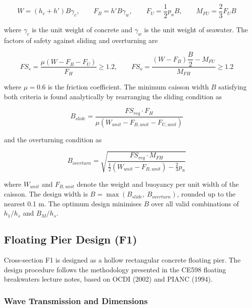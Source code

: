 \documentclass[a4paper, 11pt]{article}
\begin{document}
\begin{equation}
    W = (h_c + h')B\gamma_c, \qquad F_B = h'B\gamma_w, \qquad F_U = \frac{1}{2}p_u B, \qquad M_{FU} = \frac{2}{3}F_U B
\end{equation}

where $\gamma_c$ is the unit weight of concrete and $\gamma_w$ is the unit weight of seawater. The factors of safety against sliding and overturning are

\begin{equation}
    FS_s = \frac{\mu(W - F_B - F_U)}{F_H} \geq 1.2, \qquad FS_o = \frac{(W - F_B)\dfrac{B}{2} - M_{FU}}{M_{FH}} \geq 1.2
\end{equation}

where $\mu = 0.6$ is the friction coefficient. The minimum caisson width $B$ satisfying both criteria is found analytically by rearranging the sliding condition as

\begin{equation}
    B_{slide} = \frac{FS_{req} \cdot F_H}{\mu(W_{unit} - F_{B,unit} - F_{U,unit})}
\end{equation}

and the overturning condition as

\begin{equation}
    B_{overturn} = \sqrt{\frac{FS_{req} \cdot M_{FH}}{\frac{1}{2}(W_{unit} - F_{B,unit}) - \frac{2}{3}p_u}}
\end{equation}

where $W_{unit}$ and $F_{B,unit}$ denote the weight and buoyancy per unit width of the caisson. The design width is $B = \max(B_{slide},\ B_{overturn})$, rounded up to the nearest 0.1 m. The optimum design minimises $B$ over all valid combinations of $h_1/h_s$ and $B_M/h_s$.

\subsection{Floating Pier Design (F1)}

\hspace*{0.5cm} Cross-section F1 is designed as a hollow rectangular concrete floating pier. The design procedure follows the methodology presented in the CE598 floating breakwaters lecture notes, based on OCDI (2002) and PIANC (1994).

\subsubsection{Wave Transmission and Dimensions}
\end{document}
